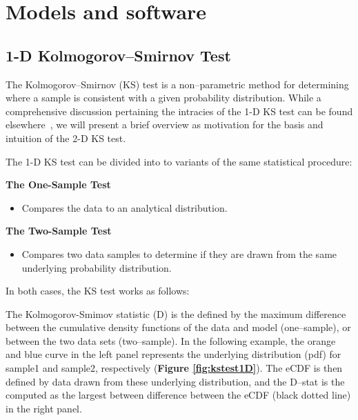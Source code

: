 \documentclass[codesnippet]{jss}
\begin{document}


\section{Models and software} \label{sec:models}

\subsection{1-D Kolmogorov--Smirnov Test}

The Kolmogorov--Smirnov (KS) test is a non--parametric method for determining where a sample is consistent with a given probability distribution. While a comprehensive discussion pertaining the intracies of the 1-D KS test can be found elsewhere~\citep{Stephens1992a}, we will present a brief overview as motivation for the basis and intuition of the 2-D KS test.

The 1-D KS test can be divided into to variants of the same statistical procedure:

\begin{leftbar}
\textbf{The One-Sample Test}
\begin{itemize}
\item Compares the data to an analytical distribution.
\end{itemize}
\textbf{The Two-Sample Test}
\begin{itemize}
\item Compares two data samples to determine if they are drawn from the same underlying probability distribution.
\end{itemize}
\end{leftbar}

In both cases, the KS test works as follows:

The Kolmogorov-Smimov statistic (D) is the defined by the maximum difference between the cumulative density functions of the data and model (one--sample), or between the two data sets (two--sample). In the following example, the orange and blue curve in the left panel represents the underlying distribution (pdf) for sample1 and sample2, respectively (\textbf{Figure \ref{fig:kstest1D}}). The eCDF is then defined by data drawn from these underlying distribution, and the D--stat is the computed as the largest between difference between the eCDF (black dotted line) in the right panel.
\end{document}

